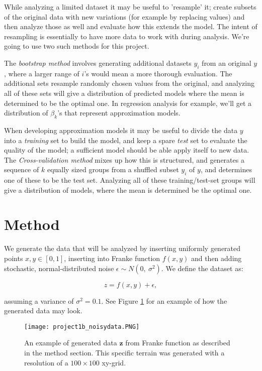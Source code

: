\documentclass[reprint,english,notitlepage]{revtex4-1}  %
\begin{document}
While analyzing a limited dataset it may be useful to 'resample' it; create subsets of the original data with new variations (for example by replacing values) and then analyze those as well and evaluate how this extends the model. The intent of resampling is essentially to have more data to work with during analysis. We're going to use two such methods for this project.

The \textit{bootstrap method} involves generating additional datasets $y_i$ from an original $y$, where a larger range of $i$'s would mean a more thorough evaluation. The additional sets resample randomly chosen values from the original, and analyzing all of these sets will give a distribution of predicted models where the mean is determined to be the optimal one. In regression analysis for example, we'll get a distribution of $\beta_k$'s that represent approximation models.

When developing approximation models it may be useful to divide the data $y$ into a \textit{training} set to build the model, and keep a spare \textit{test} set to evaluate the quality of the model; a sufficient model should be able apply itself to new data. The \textit{Cross-validation method} mixes up how this is structured, and generates a sequence of $k$ equally sized groups from a shuffled subset $y_i$ of $y$, and determines one of these to be the test set. Analyzing all of these training/test-set groups will give a distribution of models, where the mean is determined be the optimal one.



\section{Method}

We generate the data that will be analyzed by inserting uniformly generated points $x, y \in [0, 1]$, inserting into Franke function $f(x, y)$ and then adding stochastic, normal-distributed noise $\epsilon \sim N(0, \ \sigma^2)$. We define the dataset as:

$$z = f(x, y) + \epsilon,$$

assuming a variance of $\sigma^2 = 0.1$. See Figure \ref{fig:noise} for an example of how the generated data may look.

\begin{figure}[h!]
    \centering
    \texttt{[image: project1b\_noisydata.PNG]}
    \caption{An example of generated data $\textbf{z}$ from Franke function as described in the method section. This specific terrain was generated with a resolution of a $100 \times 100$ xy-grid.}
    \label{fig:noise}
\end{figure}
\end{document}
